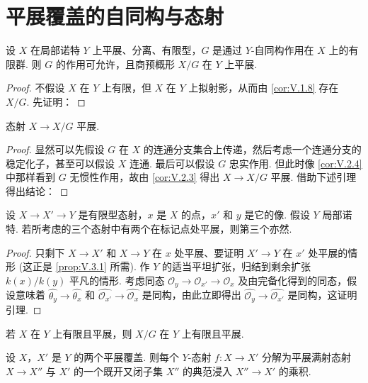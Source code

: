 \section{平展覆盖的自同构与态射}

\begin{proposition}\label{prop:V.3.1}
设 $X$ 在局部诺特 $Y$ 上平展、分离、有限型，$G$ 是通过 $Y$-自同构作用在 $X$ 上的有限群. 则 $G$ 的作用可允许，且商预概形 $X/G$ 在 $Y$ 上平展.
\end{proposition}

\begin{proof}
不假设 $X$ 在 $Y$ 上有限，但 $X$ 在 $Y$ 上拟射影，从而由 \ref{cor:V.1.8} 存在 $X/G$. 先证明：
\end{proof}

\begin{corollary}\label{cor:V.3.2}
态射 $X \to X/G$ 平展.
\end{corollary}

\begin{proof}
显然可以先假设 $G$ 在 $X$ 的连通分支集合上传递，然后考虑一个连通分支的稳定化子，甚至可以假设 $X$ 连通. 最后可以假设 $G$ 忠实作用. 但此时像 \ref{cor:V.2.4} 中那样看到 $G$ 无惯性作用，故由 \ref{cor:V.2.3} 得出 $X \to X/G$ 平展. 借助下述引理得出结论：
\end{proof}

 \begin{lemma}[对讲 I 的更正]\label{lem:V.3.3}
设 $X \to X' \to Y$ 是有限型态射，$x$ 是 $X$ 的点，$x'$ 和 $y$ 是它的像. 假设 $Y$ 局部诺特. 若所考虑的三个态射中有两个在标记点处平展，则第三个亦然.
\end{lemma}

\begin{proof}
只剩下 $X \to X'$ 和 $X \to Y$ 在 $x$ 处平展、要证明 $X' \to Y$ 在 $x'$ 处平展的情形 (这正是 \ref{prop:V.3.1} 所需). 作 $Y$ 的适当平坦扩张，归结到剩余扩张 $k(x)/k(y)$ 平凡的情形. 考虑同态 $\mathcal{O}_y \to \mathcal{O}_{x'} \to \mathcal{O}_x$ 及由完备化得到的同态，假设意味着 $\widehat{\theta_y} \to \widehat{\theta_x}$ 和 $\widehat{\mathcal{O}_{x'}} \to \widehat{\mathcal{O}_x}$ 是同构，由此立即得出 $\widehat{\mathcal{O}_y} \to \widehat{\mathcal{O}_{x'}}$ 是同构，这证明引理.
\end{proof}

\begin{corollary}\label{cor:V.3.4}
若 $X$ 在 $Y$ 上有限且平展，则 $X/G$ 在 $Y$ 上有限且平展.
\end{corollary}

\begin{proposition}\label{prop:V.3.5}
设 $X$，$X'$ 是 $Y$ 的两个平展覆盖. 则每个 $Y$-态射 $f \colon X \to X'$ 分解为平展满射态射 $X \to X''$ 与 $X'$ 的一个既开又闭子集 $X''$ 的典范浸入 $X'' \to X'$ 的乘积.
\end{proposition}

